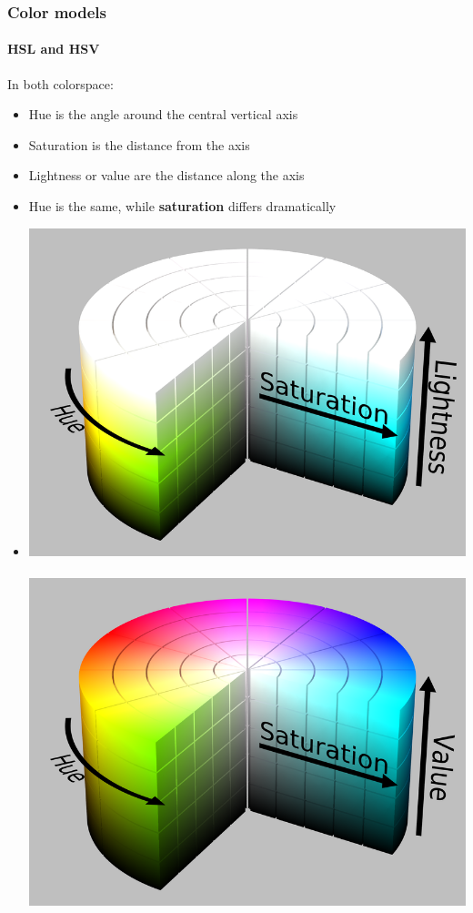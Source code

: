 \documentclass{beamer}
\begin{document}
\begin{frame}
\frametitle{Color models}
\framesubtitle{HSL and HSV}
\footnotesize{
 In both colorspace: 
\begin{itemize}
	\item Hue is the angle around the central vertical axis
	\item Saturation is the distance from the axis
	\item Lightness or value are the distance along the axis
	\item Hue is the same, while \textbf{saturation} differs dramatically
	\item[]
	\begin{center}	
	\includegraphics[scale=0.06]{images/L6_HSL1.png}\
	\includegraphics[scale=0.06]{images/L6_HSV1.png}
	\end{center}
	

\end{itemize}}
\end{frame}
\end{document}
